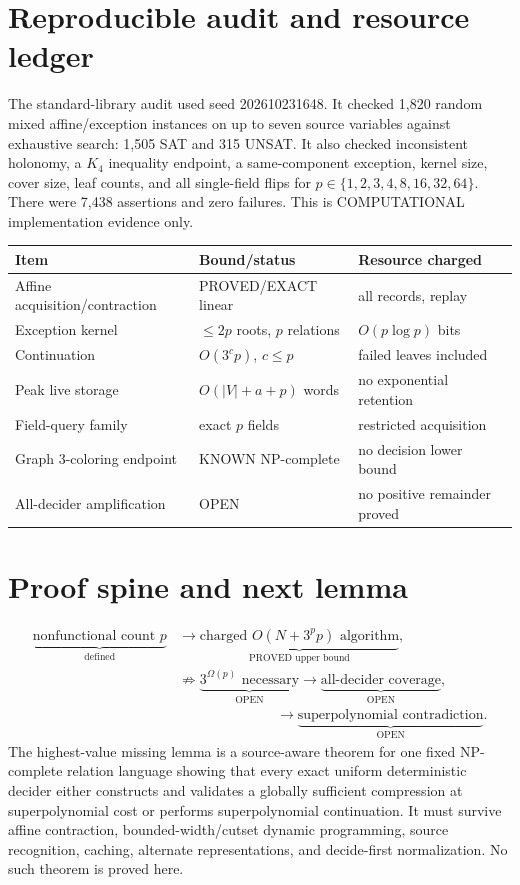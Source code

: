 \documentclass[11pt]{article}
\begin{document}
\section{Reproducible audit and resource ledger}
The standard-library audit used seed 202610231648. It checked 1,820 random
mixed affine/exception instances on up to seven source variables against
exhaustive search: 1,505 SAT and 315 UNSAT. It also checked inconsistent
holonomy, a $K_4$ inequality endpoint, a same-component exception, kernel
size, cover size, leaf counts, and all single-field flips for
$p\in\{1,2,3,4,8,16,32,64\}$. There were 7,438 assertions and zero
failures. This is COMPUTATIONAL implementation evidence only.

\begin{center}
\begin{tabular}{lll}
\toprule
Item & Bound/status & Resource charged\\
\midrule
Affine acquisition/contraction & PROVED/EXACT linear & all records, replay\\
Exception kernel & $\le2p$ roots, $p$ relations & $O(p\log p)$ bits\\
Continuation & $O(3^c p)$, $c\le p$ & failed leaves included\\
Peak live storage & $O(|V|+a+p)$ words & no exponential retention\\
Field-query family & exact $p$ fields & restricted acquisition\\
Graph 3-coloring endpoint & KNOWN NP-complete & no decision lower bound\\
All-decider amplification & OPEN & no positive remainder proved\\
\bottomrule
\end{tabular}
\end{center}

\section{Proof spine and next lemma}
\begin{align*}
\underbrace{\text{nonfunctional count }p}_{\text{defined}}
&\longrightarrow
\underbrace{\text{charged }O(N+3^pp)\text{ algorithm}}_{\text{PROVED upper bound}},\\
&\not\Longrightarrow
\underbrace{3^{\Omega(p)}\text{ necessary}}_{\text{OPEN}}
\longrightarrow
\underbrace{\text{all-decider coverage}}_{\text{OPEN}},\\
&\hspace{7em}\longrightarrow
\underbrace{\text{superpolynomial contradiction}}_{\text{OPEN}}.
\end{align*}
The highest-value missing lemma is a source-aware theorem for one fixed
NP-complete relation language showing that every exact uniform deterministic
decider either constructs and validates a globally sufficient compression at
superpolynomial cost or performs superpolynomial continuation. It must
survive affine contraction, bounded-width/cutset dynamic programming, source
recognition, caching, alternate representations, and decide-first
normalization. No such theorem is proved here.
\end{document}
